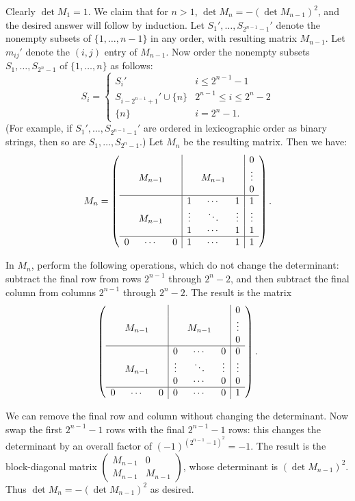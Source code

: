 \documentclass[amssymb,twocolumn,pra,10pt,aps]{revtex4-1}
\begin{document}
\begin{itemize}
Clearly $\det M_1 = 1$. We claim that for $n>1$, $\det M_n = -(\det M_{n-1})^2$, and the desired answer will follow by induction. Let $S_1',\ldots,S_{2^{n-1}-1}'$ denote the nonempty subsets of $\{1,\ldots,n-1\}$ in any order, with resulting matrix $M_{n-1}$. Let $m_{ij}'$ denote the $(i,j)$ entry of $M_{n-1}$. Now order the nonempty subsets $S_1,\ldots,S_{2^n-1}$ of $\{1,\ldots,n\}$ as follows: 
\[
S_i= \begin{cases} S_i' &  i \leq 2^{n-1}-1 \\
S_{i-2^{n-1}+1}' \cup \{n\} & 2^{n-1} \leq i \leq 2^n-2 \\
\{n\} & i=2^{n}-1.
\end{cases}
\]
(For example, if $S_1', \dots, S_{2^{n-1}-1}'$ are ordered in lexicographic order
as binary strings, then so are $S_1,\dots,S_{2^n-1}$.)
Let $M_n$ be the resulting matrix. Then we have:
\[
M_n = \left( \begin{array}{ccc|ccc|c}
&&&&&& 0 \\
& M_{n-1} &&& M_{n-1} && \vdots \\
&&&&&& 0 \\ \hline
&&&1 & \cdots & 1 & 1 \\
& M_{n-1} && \vdots & \ddots & \vdots & \vdots \\
&&&1 &\cdots & 1 & 1 \\ \hline
0 & \cdots & 0 & 1 & \cdots & 1 & 1
\end{array} \right).
\]

In $M_n$, perform the following operations, which do not change the determinant: subtract the final row from rows $2^{n-1}$ through $2^n-2$, and then subtract the final column from columns $2^{n-1}$ through $2^n-2$. The result is the matrix
\[
\left( \begin{array}{ccc|ccc|c}
&&&&&& 0 \\
& M_{n-1} &&& M_{n-1} && \vdots \\
&&&&&& 0 \\ \hline
&&&0 & \cdots & 0 & 0 \\
& M_{n-1} && \vdots & \ddots & \vdots & \vdots \\
&&&0 &\cdots & 0 & 0 \\ \hline
0 & \cdots & 0 & 0 & \cdots & 0 & 1
\end{array} \right).
\]

We can remove the final row and column without changing the determinant. Now swap the first $2^{n-1}-1$ rows with the final $2^{n-1}-1$ rows: this changes the determinant by an overall factor of $(-1)^{(2^{n-1}-1)^2} = -1$. The result is the block-diagonal matrix $\left( \begin{matrix} M_{n-1} & 0 \\ M_{n-1} & M_{n-1} \end{matrix} \right)$, whose determinant is $(\det M_{n-1})^2$. Thus $\det M_n = -(\det M_{n-1})^2$ as desired.


\end{itemize}
\end{document}
